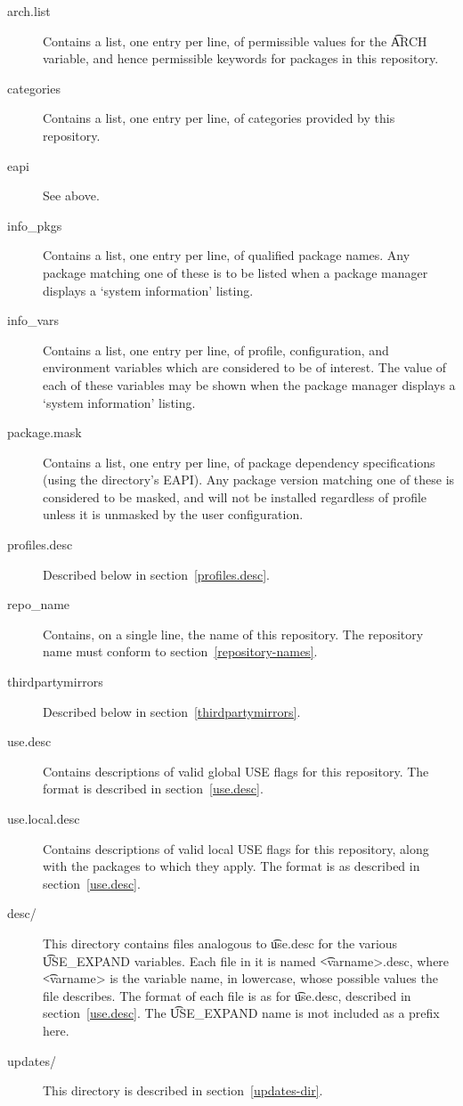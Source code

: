 \begin{description}
\item[arch.list] \label{arch.list} Contains a list, one entry per line, of permissible values for
    the \t{ARCH} variable, and hence permissible keywords for packages in this repository.
\item[categories] \label{profiles-categories} Contains a list, one entry per line, of categories
    provided by this repository.
\item[eapi] See above.
\item[info\_pkgs] Contains a list, one entry per line, of qualified package names. Any package
    matching one of these is to be listed when a package manager displays a `system information'
    listing.
\item[info\_vars] Contains a list, one entry per line, of profile, configuration, and environment
    variables which are considered to be of interest. The value of each of these variables may be
    shown when the package manager displays a `system information' listing.
\item[package.mask] \label{profiles-package.mask}
    Contains a list, one entry per line, of package dependency specifications (using the directory's
    EAPI). Any package version matching one of these is considered to be masked, and will not be
    installed regardless of profile unless it is unmasked by the user configuration.
\item[profiles.desc] Described below in section~\ref{profiles.desc}.
\item[repo\_name] Contains, on a single line, the name of this repository. The repository name must
    conform to section~\ref{repository-names}.
\item[thirdpartymirrors] Described below in section~\ref{thirdpartymirrors}.
\item[use.desc] Contains descriptions of valid global USE flags for this repository. The format is
    described in section~\ref{use.desc}.
\item[use.local.desc] Contains descriptions of valid local USE flags for this repository, along with
    the packages to which they apply. The format is as described in section~\ref{use.desc}.
\item[desc/] This directory contains files analogous to \t{use.desc} for the various \t{USE\_EXPAND}
    variables. Each file in it is named \t{<varname>.desc}, where \t{<varname>} is the variable
    name, in lowercase, whose possible values the file describes. The format of each file is as for
    \t{use.desc}, described in section~\ref{use.desc}. The \t{USE\_EXPAND} name is \i{not}
    included as a prefix here.
\item[updates/] This directory is described in section~\ref{updates-dir}.
\end{description}

